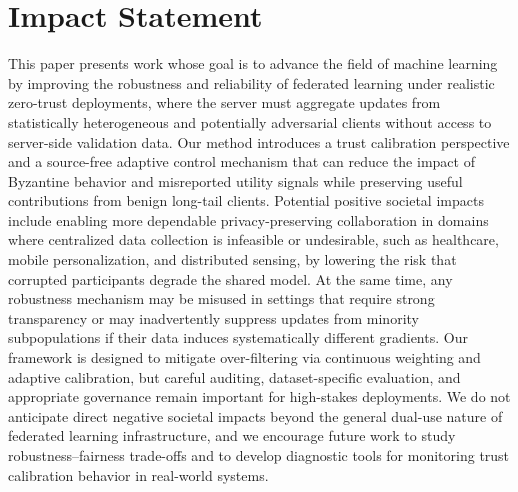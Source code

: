 \documentclass{article}
\theoremstyle{plain}
\theoremstyle{definition}
\theoremstyle{remark}
\begin{document}
\printAffiliationsAndNotice{}  %











\medskip
\section*{Impact Statement}
This paper presents work whose goal is to advance the field of machine learning by improving the robustness and reliability of federated learning under realistic zero-trust deployments, where the server must aggregate updates from statistically heterogeneous and potentially adversarial clients without access to server-side validation data. Our method introduces a trust calibration perspective and a source-free adaptive control mechanism that can reduce the impact of Byzantine behavior and misreported utility signals while preserving useful contributions from benign long-tail clients.
Potential positive societal impacts include enabling more dependable privacy-preserving collaboration in domains where centralized data collection is infeasible or undesirable, such as healthcare, mobile personalization, and distributed sensing, by lowering the risk that corrupted participants degrade the shared model. At the same time, any robustness mechanism may be misused in settings that require strong transparency or may inadvertently suppress updates from minority subpopulations if their data induces systematically different gradients. Our framework is designed to mitigate over-filtering via continuous weighting and adaptive calibration, but careful auditing, dataset-specific evaluation, and appropriate governance remain important for high-stakes deployments.
We do not anticipate direct negative societal impacts beyond the general dual-use nature of federated learning infrastructure, and we encourage future work to study robustness--fairness trade-offs and to develop diagnostic tools for monitoring trust calibration behavior in real-world systems.





\newpage
\appendix
\onecolumn

\end{document}
